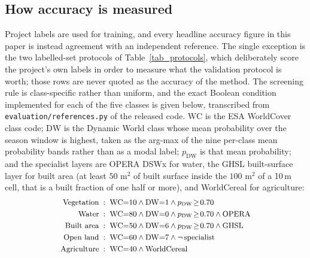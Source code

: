 \documentclass[conference]{IEEEtran}
\begin{document}
\subsection{How accuracy is measured}
\label{sec:accuracy}
Project labels are used for training, and every headline accuracy figure in this paper is instead agreement with an independent reference. The single exception is the two labelled-set protocols of Table~\ref{tab_protocols}, which deliberately score the project's own labels in order to measure what the validation protocol is worth; those rows are never quoted as the accuracy of the method. The screening rule is class-specific rather than uniform, and the exact Boolean condition implemented for each of the five classes is given below, transcribed from \texttt{evaluation/references.py} of the released code. $\mathrm{WC}$ is the ESA WorldCover \cite{r14} class code; $\mathrm{DW}$ is the Dynamic World \cite{r15} class whose mean probability over the season window is highest, taken as the arg-max of the nine per-class mean probability bands rather than as a modal label; $p_{\mathrm{DW}}$ is that mean probability; and the specialist layers are OPERA DSWx for water, the GHSL built-surface layer for built area (at least $50\text{ m}^2$ of built surface inside the $100\text{ m}^2$ of a 10\,m cell, that is a built fraction of one half or more), and WorldCereal \cite{r16} for agriculture:
\begin{equation}
\small
\begin{aligned}
\text{Vegetation}  \;&:\; \mathrm{WC}{=}10 \wedge \mathrm{DW}{=}1 \wedge p_{\mathrm{DW}}\!\ge\!0.70 \\
\text{Water}       \;&:\; \mathrm{WC}{=}80 \wedge \mathrm{DW}{=}0 \wedge p_{\mathrm{DW}}\!\ge\!0.70 \wedge \mathrm{OPERA} \\
\text{Built area}  \;&:\; \mathrm{WC}{=}50 \wedge \mathrm{DW}{=}6 \wedge p_{\mathrm{DW}}\!\ge\!0.70 \wedge \mathrm{GHSL} \\
\text{Open land}   \;&:\; \mathrm{WC}{=}60 \wedge \mathrm{DW}{=}7 \wedge \neg\,\mathrm{specialist} \\
\text{Agriculture} \;&:\; \mathrm{WC}{=}40 \wedge \mathrm{WorldCereal}
\end{aligned}
\label{eq:refrules}
\end{equation}
\end{document}
